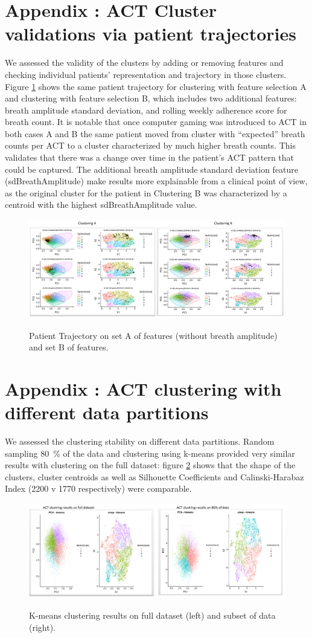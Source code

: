 \documentclass{article}
\begin{document}
\section{Appendix : ACT Cluster validations via patient trajectories}
We assessed the validity of the clusters by adding or removing features and checking individual patients’ representation and trajectory in those clusters. Figure \ref{fig:ACTclusteringAB} shows the same patient trajectory for clustering with feature selection A and clustering with feature selection B, which includes two additional features: breath amplitude standard deviation, and rolling weekly adherence score for breath count. It is notable that once computer gaming was introduced to ACT in both cases A and B the same patient moved from cluster with “expected” breath counts per ACT to a cluster characterized by much higher breath counts. This validates that there was a change over time in the patient’s ACT pattern that could be captured. The additional breath amplitude standard deviation feature (sdBreathAmplitude) make results more explainable from a clinical point of view, as the original cluster for the patient in Clustering B was characterized by a centroid with the highest sdBreathAmplitude value. 

\begin{figure}[htb]
  \centering
  \caption{Patient Trajectory on set A of features (without breath amplitude) and set B of features.}
  \includegraphics[]{ACTclusteringAB.png}
  \label{fig:ACTclusteringAB}
\end{figure}



\section{Appendix : ACT clustering with different data partitions}
We assessed the clustering stability on different data partitions. Random sampling 80~\% of the data and clustering using k-means provided very similar results with clustering on the full dataset: figure \ref{fig:ACTclusteringon80} shows that the shape of the clusters, cluster centroids as well as Silhouette Coefficients and Calinski-Harabaz Index (2200 v 1770 respectively) were comparable. 

\begin{figure}[!htb]
  \centering
  \caption{K-means clustering results on full dataset (left) and subset of data (right).}
  \includegraphics[]{ACTclusteringOn80.png}
  \label{fig:ACTclusteringon80}
\end{figure}
\end{document}
